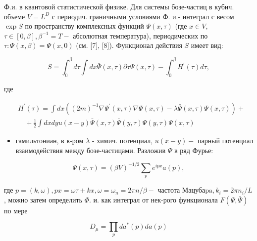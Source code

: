 \documentclass[10pt]{article}
\begin{document}
Ф.и. в квантовой статистической физике. Для системы бозе-частиц в кубич. объеме $V=L^{D}$ с периодич. граничными условиями Ф. и.- интеграл с весом $\exp S$ по пространству комплексных функций $\Psi(x, \tau)$ (где $x \in V$, $\tau \in[0, \beta], \beta^{-1}=T-$ абсолютная температура), периодических по $\tau: \Psi(x, \beta)=\Psi(x, 0)$ (см. [7], [8]). Функционал действия $S$ имеет вид:



\[

S=\int_{0}^{\beta} d \tau \int d x \bar{\Psi}(x, \tau) \partial \tau \Psi(x, \tau)-\int_{0}^{\beta} H^{\prime}(\tau) d \tau,

\]



где



\[

\begin{aligned}

& H^{\prime}(\tau)=\int d x\left((2 m)^{-1} \nabla \Psi^{\prime}(x, \tau) \nabla \Psi(x, \tau)-\lambda \bar{\Psi}(x, \tau) \Psi(x, \tau)\right)+ \\

& \quad+\frac{1}{2} \int d x d y u(x-y) \bar{\Psi}(x, \tau) \bar{\Psi}(y, \tau) \Psi(y, \tau) \Psi(x, \tau)

\end{aligned}

\]



\begin{itemize}

  \item гамильтониан, в к-ром $\lambda$ - химич. потенциал, $u(x-y)-$ парный потенциал взаимодействия между бозе-частицами. Разложив $\Psi$ в ряд Фурье:

\end{itemize}



\[

\Psi(x, \tau)=(\beta V)^{-1 / 2} \sum_{p} e^{i p x} a(p),

\]



где $p=(k, \omega), p x=\omega \tau+k x, \omega=\omega_{n}=2 \pi n / \beta-$ частота Мацуба$\mathrm{pa}, k_{i}=2 \pi n_{i} / L$, можно затем определить $\Phi$. и. как интеграл от нек-рого функционала $F(\Psi, \bar{\Psi})$ по мере



\[

D_{\mu}=\prod_{p} d a^{*}(p) d a(p)

\]
\end{document}
